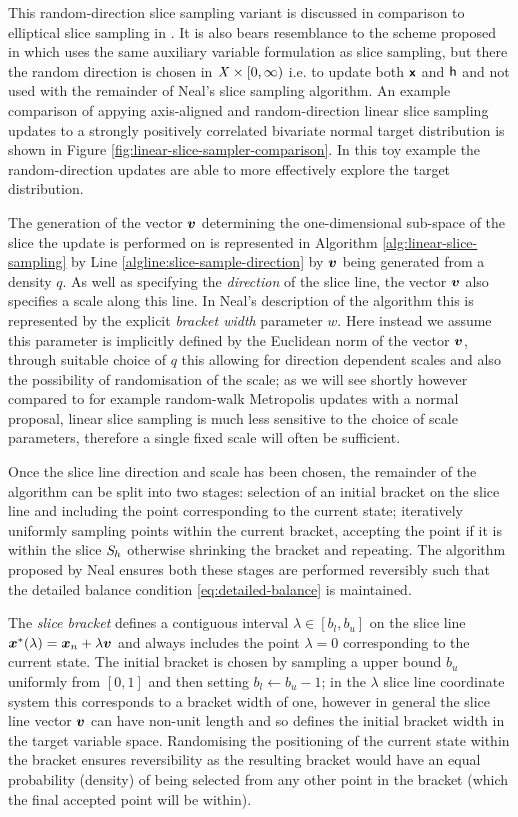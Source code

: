This random-direction slice sampling variant is discussed in comparison to elliptical slice sampling in \citep{murray2010elliptical}. It is also bears resemblance to the scheme proposed in \citep{chen1998toward} which uses the same auxiliary variable formulation as slice sampling, but there the random direction is chosen in $\mathit{X}\times[0,\infty)$ i.e. to update both $\boldsymbol{\mathsf{x}}$ and $\mathsf{h}$ and not used with the remainder of Neal's slice sampling algorithm. An example comparison of appying axis-aligned and random-direction linear slice sampling updates to a strongly positively correlated bivariate normal target distribution is shown in Figure \ref{fig:linear-slice-sampler-comparison}. In this toy example the random-direction updates are able to more effectively explore the target distribution.

The generation of the vector $\boldsymbol{v}$ determining the one-dimensional sub-space of the slice the update is performed on is represented in Algorithm \ref{alg:linear-slice-sampling} by Line \ref{algline:slice-sample-direction} by $\boldsymbol{v}$ being generated from a density $q$. As well as specifying the \emph{direction} of the slice line, the vector $\boldsymbol{v}$ also specifies a scale along this line. In Neal's description of the algorithm this is represented by the explicit \emph{bracket width} parameter $w$. Here instead we assume this parameter is implicitly defined by the Euclidean norm of the vector $\boldsymbol{v}$, through suitable choice of $q$ this allowing for direction dependent scales and also the possibility of randomisation of the scale; as we will see shortly however compared to for example random-walk Metropolis updates with a normal proposal, linear slice sampling is much less sensitive to the choice of scale parameters, therefore a single fixed scale will often be sufficient.

Once the slice line direction and scale has been chosen, the remainder of the algorithm can be split into two stages: selection of an initial bracket on the slice line and including the point corresponding to the current state; iteratively uniformly sampling points within the current bracket, accepting the point if it is within the slice $\mathit{S}_h$ otherwise shrinking the bracket and repeating. The algorithm proposed by Neal ensures both these stages are performed reversibly such that the detailed balance condition \eqref{eq:detailed-balance} is maintained.

The \emph{slice bracket} defines a contiguous interval $\lambda \in [b_l,b_u]$ on the slice line $\boldsymbol{x}^*(\lambda) = \boldsymbol{x}_n + \lambda \boldsymbol{v}$ and always includes the point $\lambda = 0$ corresponding to the current state. The initial bracket is chosen by sampling a upper bound $b_u$ uniformly from $[0, 1]$ and then setting $b_l \gets b_u - 1$; in the $\lambda$ slice line coordinate system this corresponds to a bracket width of one, however in general the slice line vector $\boldsymbol{v}$ can have non-unit length and so defines the initial bracket width in the target variable space. Randomising the positioning of the current state within the bracket ensures reversibility as the resulting bracket would have an equal probability (density) of being selected from any other point in the bracket (which the final accepted point will be within).

